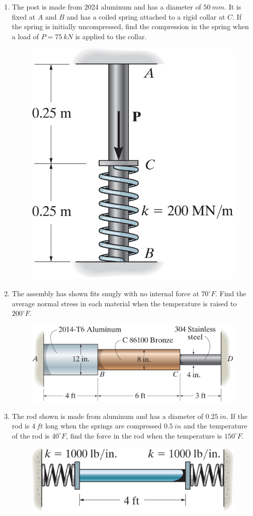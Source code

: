 \documentclass[12pt, oneside]{article}
\let\US\SI
\begin{document}
\begin{enumerate}
	\item %
		The post is made from 2024 aluminum and has a diameter of $\SI{50}{mm}$.
		It is fixed at $A$ and $B$ and has a coiled spring attached to a rigid collar at $C$.
		If the spring is initially uncompressed, find the compression in the spring when a load of $P = \SI{75}{kN}$ is applied to the collar.
		\begin{figure}[H]
			\centering
			\includegraphics[width=0.45\linewidth]{4-59}
		\end{figure}

	\item %
		The assembly has shown fits snugly with no internal force at $70 ^\circ F$.
		Find the average normal stress in each material when the temperature is raised to $200 ^\circ F$.
		\begin{figure}[H]
			\centering
			\includegraphics[width=0.8\linewidth]{4-69}
		\end{figure}

	\item %
		The rod shown is made from aluminum and has a diameter of $\US{0.25}{in}$.
		If the rod is $\US{4}{ft}$ long when the springs are compressed $\US{0.5}{in}$ and the temperature of the rod is $40 ^\circ F$, find the force in the rod when the temperature is $150 ^\circ F$.
		\begin{figure}[H]
			\centering
			\includegraphics[width=0.8\linewidth]{4-70}
		\end{figure}
		\newpage


\end{enumerate}
\end{document}
